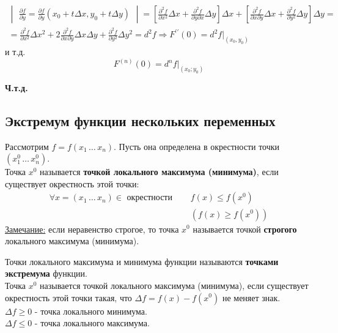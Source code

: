 \documentclass[12pt]{article}
\begin{document}
\begin{adjustwidth}{1.5em}{1.5em}
\begin{gather*}
\begin{vmatrix}
                \frac{\partial f}{\partial y}=\frac{\partial f}{\partial y}\left(x_0+t \Delta x, y_0+t \Delta y\right)
            \end{vmatrix} =\left[\frac{\partial^2 f}{\partial x^2} \Delta x+\frac{\partial^2 f}{\partial y \partial x} \Delta y\right] \Delta x+\left[\frac{\partial^2 f}{\partial x \partial y} \Delta x+\frac{\partial^2 f}{\partial y^2} \Delta y\right] \Delta y \boxed{=}  \\
            \boxed{=} \frac{\partial^2 f}{\partial x^2} \Delta x^2+2 \frac{\partial^2 f}{\partial x \partial y} \Delta x \Delta y+\frac{\partial^2 f}{\partial y^2} \Delta y^2=d^2 f \Rightarrow F^{\prime \prime}(0)=d^2 f \Big|_{(x_0, y_0)}
        \end{gather*}
        и т.д.
        \[ F^{(n)}(0) = d^n f \Big|_{(x_0; y_0)} \]
        \begin{center}
            \textbf{Ч.т.д.}
        \end{center}
    \end{adjustwidth}

    \subsection{Экстремум функции нескольких переменных}
    Рассмотрим $f = f(x_1\, \dots\, x_n)$. Пусть она определена в окрестности точки $(x^0_1\, \dots\, x^0_n)$.\\
    Точка $x^0$ называется \textbf{точкой локального максимума (минимума)}, если существует окрестность этой точки:
    \begin{align*} 
        \forall x = (x_1\, \dots\, x_n) \in \text{ окрестности } \quad &f(x) \le f(x^0) \\
        &(f(x) \ge f(x^0))
    \end{align*}
    \underline{Замечание:} если неравенство строгое, то точка $x^0$ называется точкой \textbf{строгого} локального максимума (минимума).\par\noindent
    Точки локального максимума и минимума функции называются \textbf{точками экстремума} функции.\\
    Точка $x^0$ называется точкой локального максимума (минимума), если существует окрестность этой точки такая, что $\Delta f = f(x) - f(x^0)$ не меняет знак.\\
    $\Delta f \ge 0$ - точка локального минимума.\\
    $\Delta f \le 0$ - точка локального максимума.
\end{document}
